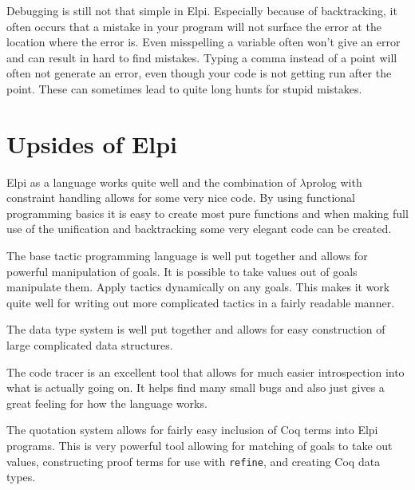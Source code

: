 \documentclass[thesis.tex]{subfiles}
\begin{document}
Debugging is still not that simple in Elpi. Especially because of backtracking, it often occurs that a mistake in your program will not surface the error at the location where the error is. Even misspelling a variable often won't give an error and can result in hard to find mistakes. Typing a comma instead of a point will often not generate an error, even though your code is not getting run after the point. These can sometimes lead to quite long hunts for stupid mistakes.

\section*{Upsides of Elpi}
Elpi as a language works quite well and the combination of $\lambda$prolog with constraint handling allows for some very nice code. By using functional programming basics it is easy to create most pure functions and when making full use of the unification and backtracking some very elegant code can be created.

The base tactic programming language is well put together and allows for powerful manipulation of goals. It is possible to take values out of goals manipulate them. Apply tactics dynamically on any goals. This makes it work quite well for writing out more complicated tactics in a fairly readable manner.

The data type system is well put together and allows for easy construction of large complicated data structures.

The code tracer is an excellent tool that allows for much easier introspection into what is actually going on. It helps find many small bugs and also just gives a great feeling for how the language works.

The quotation system allows for fairly easy inclusion of Coq terms into Elpi programs. This is very powerful tool allowing for matching of goals to take out values, constructing proof terms for use with \texttt{refine}, and creating Coq data types.
\end{document}
